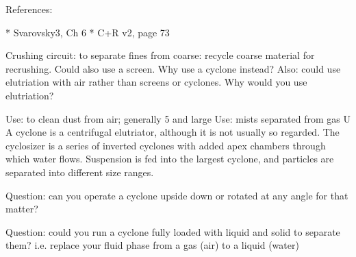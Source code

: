 References:

* Svarovsky3, Ch 6
* C+R v2, page 73


Crushing circuit: to separate fines from coarse: recycle coarse material for recrushing. Could also use a screen. Why use a cyclone instead?
Also: could use elutriation with air rather than screens or cyclones. Why would you use elutriation?

Use: to clean dust from air; generally 5 \micron and large
Use: mists separated from gas
U
A cyclone is a centrifugal elutriator, although it is not usually so regarded. The cyclosizer is a series of inverted cyclones with added apex chambers through which water flows. Suspension is fed into the largest cyclone, and particles are separated into different size ranges.

Question: can you operate a cyclone upside down or rotated at any angle for that matter?

Question: could you run a cyclone fully loaded with liquid and solid to separate them? i.e. replace your fluid phase from a gas (air) to a liquid (water)


